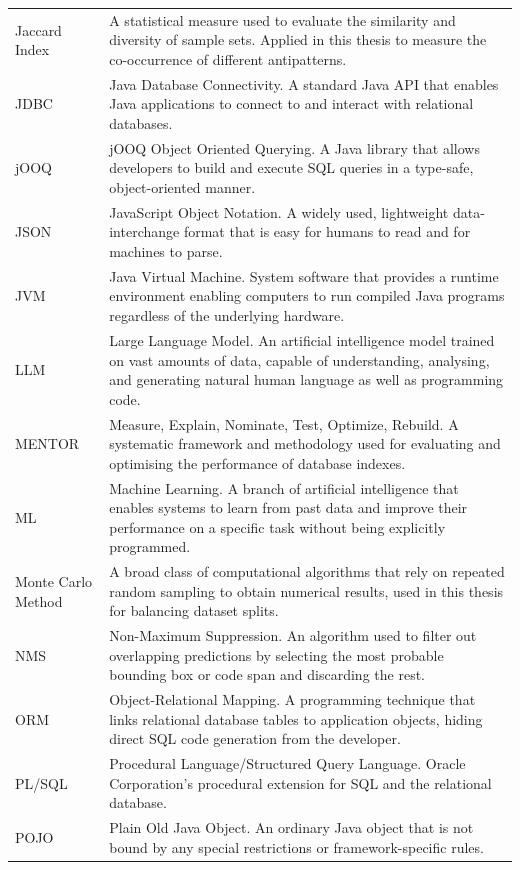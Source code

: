 \begin{longtable}{p{3cm}p{10cm}}
Jaccard Index & A statistical measure used to evaluate the similarity and diversity of sample sets. Applied in this thesis to measure the co-occurrence of different antipatterns.\\
JDBC & Java Database Connectivity. A standard Java API that enables Java applications to connect to and interact with relational databases.\\
jOOQ & jOOQ Object Oriented Querying. A Java library that allows developers to build and execute SQL queries in a type-safe, object-oriented manner.\\
JSON & JavaScript Object Notation. A widely used, lightweight data-interchange format that is easy for humans to read and for machines to parse.\\
JVM & Java Virtual Machine. System software that provides a runtime environment enabling computers to run compiled Java programs regardless of the underlying hardware.\\
LLM & Large Language Model. An artificial intelligence model trained on vast amounts of data, capable of understanding, analysing, and generating natural human language as well as programming code.\\
MENTOR & Measure, Explain, Nominate, Test, Optimize, Rebuild. A systematic framework and methodology used for evaluating and optimising the performance of database indexes.\\
ML & Machine Learning. A branch of artificial intelligence that enables systems to learn from past data and improve their performance on a specific task without being explicitly programmed.\\
Monte Carlo \newline Method & A broad class of computational algorithms that rely on repeated random sampling to obtain numerical results, used in this thesis for balancing dataset splits.\\
NMS & Non-Maximum Suppression. An algorithm used to filter out overlapping predictions by selecting the most probable bounding box or code span and discarding the rest.\\
ORM & Object-Relational Mapping. A programming technique that links relational database tables to application objects, hiding direct SQL code generation from the developer.\\
PL/SQL & Procedural Language/Structured Query Language. Oracle Corporation's procedural extension for SQL and the relational database.\\
POJO & Plain Old Java Object. An ordinary Java object that is not bound by any special restrictions or framework-specific rules.\\

\end{longtable}
